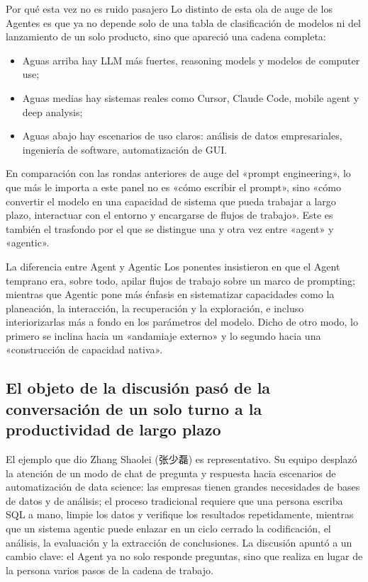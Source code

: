\documentclass[a4paper]{article}
\begin{document}
\begin{importantbox}{Por qué esta vez no es ruido pasajero}
Lo distinto de esta ola de auge de los Agentes es que ya no depende solo de una tabla de clasificación de modelos ni del lanzamiento de un solo producto, sino que apareció una cadena completa:
\begin{itemize}
  \item Aguas arriba hay LLM más fuertes, reasoning models y modelos de computer use;
  \item Aguas medias hay sistemas reales como Cursor, Claude Code, mobile agent y deep analysis;
  \item Aguas abajo hay escenarios de uso claros: análisis de datos empresariales, ingeniería de software, automatización de GUI.
\end{itemize}
\end{importantbox}

En comparación con las rondas anteriores de auge del «prompt engineering», lo que más le importa a este panel no es «cómo escribir el prompt», sino «cómo convertir el modelo en una capacidad de sistema que pueda trabajar a largo plazo, interactuar con el entorno y encargarse de flujos de trabajo». Este es también el trasfondo por el que se distingue una y otra vez entre «agent» y «agentic».

\begin{knowledgebox}{La diferencia entre Agent y Agentic}
Los ponentes insistieron en que el Agent temprano era, sobre todo, apilar flujos de trabajo sobre un marco de prompting; mientras que Agentic pone más énfasis en sistematizar capacidades como la planeación, la interacción, la recuperación y la exploración, e incluso interiorizarlas más a fondo en los parámetros del modelo. Dicho de otro modo, lo primero se inclina hacia un «andamiaje externo» y lo segundo hacia una «construcción de capacidad nativa».
\end{knowledgebox}

\subsection{El objeto de la discusión pasó de la conversación de un solo turno a la productividad de largo plazo}
El ejemplo que dio Zhang Shaolei (张少磊) es representativo. Su equipo desplazó la atención de un modo de chat de pregunta y respuesta hacia escenarios de automatización de data science: las empresas tienen grandes necesidades de bases de datos y de análisis; el proceso tradicional requiere que una persona escriba SQL a mano, limpie los datos y verifique los resultados repetidamente, mientras que un sistema agentic puede enlazar en un ciclo cerrado la codificación, el análisis, la evaluación y la extracción de conclusiones. La discusión apuntó a un cambio clave: el Agent ya no solo responde preguntas, sino que realiza en lugar de la persona varios pasos de la cadena de trabajo.
\end{document}
